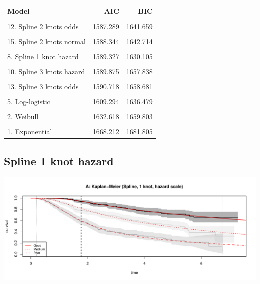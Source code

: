 \documentclass[
]{article}
\begin{document}
\begin{table}
\centering
\begin{tabular}{lrr}
\toprule
Model & AIC & BIC\\
\midrule
\cellcolor{gray!6}{9. Spline 2 knots hazard} & \cellcolor{gray!6}{1585.894} & \cellcolor{gray!6}{1640.264}\\
12. Spline 2 knots odds & 1587.289 & 1641.659\\
\cellcolor{gray!6}{14. Spline 1 knot normal} & \cellcolor{gray!6}{1587.682} & \cellcolor{gray!6}{1628.460}\\
15. Spline 2 knots normal & 1588.344 & 1642.714\\
\cellcolor{gray!6}{7. Generalised Gamma} & \cellcolor{gray!6}{1589.049} & \cellcolor{gray!6}{1629.826}\\
8. Spline 1 knot hazard & 1589.327 & 1630.105\\
\cellcolor{gray!6}{16. Spline 3 knots normal} & \cellcolor{gray!6}{1589.832} & \cellcolor{gray!6}{1657.795}\\
10. Spline 3 knots hazard & 1589.875 & 1657.838\\
\cellcolor{gray!6}{11. Spline 1 knot odds} & \cellcolor{gray!6}{1590.221} & \cellcolor{gray!6}{1630.999}\\
13. Spline 3 knots odds & 1590.718 & 1658.681\\
\cellcolor{gray!6}{4. Log-normal} & \cellcolor{gray!6}{1592.880} & \cellcolor{gray!6}{1620.066}\\
5. Log-logistic & 1609.294 & 1636.479\\
\cellcolor{gray!6}{6. Gamma} & \cellcolor{gray!6}{1621.982} & \cellcolor{gray!6}{1649.167}\\
2. Weibull & 1632.618 & 1659.803\\
\cellcolor{gray!6}{3. Gompertz} & \cellcolor{gray!6}{1660.954} & \cellcolor{gray!6}{1688.140}\\
1. Exponential & 1668.212 & 1681.805\\
\bottomrule
\end{tabular}
\end{table}

\clearpage

\hypertarget{spline-1-knot-hazard}{%
\subsection{Spline 1 knot hazard}\label{spline-1-knot-hazard}}

\begin{flushleft}\includegraphics[height=0.25\textheight]{Images/spline_hazard1-1} \end{flushleft}
\end{document}
